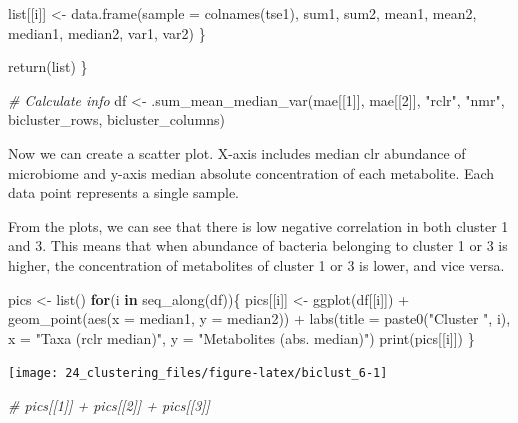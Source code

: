\documentclass[
]{book}
\newenvironment{Shaded}{\begin{snugshade}}{\end{snugshade}}
\newcommand{\AttributeTok}[1]{\textcolor[rgb]{0.77,0.63,0.00}{#1}}
\newcommand{\CommentTok}[1]{\textcolor[rgb]{0.56,0.35,0.01}{\textit{#1}}}
\newcommand{\ControlFlowTok}[1]{\textcolor[rgb]{0.13,0.29,0.53}{\textbf{#1}}}
\newcommand{\DecValTok}[1]{\textcolor[rgb]{0.00,0.00,0.81}{#1}}
\newcommand{\FunctionTok}[1]{\textcolor[rgb]{0.00,0.00,0.00}{#1}}
\newcommand{\NormalTok}[1]{#1}
\newcommand{\OtherTok}[1]{\textcolor[rgb]{0.56,0.35,0.01}{#1}}
\newcommand{\SpecialCharTok}[1]{\textcolor[rgb]{0.00,0.00,0.00}{#1}}
\newcommand{\StringTok}[1]{\textcolor[rgb]{0.31,0.60,0.02}{#1}}
\begin{document}
\begin{Shaded}
\begin{Highlighting}[]
\NormalTok{    list[[i]] }\OtherTok{\textless{}{-}} \FunctionTok{data.frame}\NormalTok{(}\AttributeTok{sample =} \FunctionTok{colnames}\NormalTok{(tse1), sum1, sum2, mean1, mean2, }
\NormalTok{                     median1, median2, var1, var2)}
\NormalTok{  \}}

  \FunctionTok{return}\NormalTok{(list)}
\NormalTok{\}}

\CommentTok{\# Calculate info}
\NormalTok{df }\OtherTok{\textless{}{-}} \FunctionTok{.sum\_mean\_median\_var}\NormalTok{(mae[[}\DecValTok{1}\NormalTok{]], mae[[}\DecValTok{2}\NormalTok{]], }\StringTok{"rclr"}\NormalTok{, }\StringTok{"nmr"}\NormalTok{, bicluster\_rows, bicluster\_columns)}
\end{Highlighting}
\end{Shaded}

Now we can create a scatter plot. X-axis includes median clr abundance
of microbiome and y-axis median absolute concentration of each
metabolite. Each data point represents a single sample.

From the plots, we can see that there is low negative correlation in
both cluster 1 and 3. This means that when abundance of bacteria
belonging to cluster 1 or 3 is higher, the concentration of
metabolites of cluster 1 or 3 is lower, and vice versa.

\begin{Shaded}
\begin{Highlighting}[]
\NormalTok{pics }\OtherTok{\textless{}{-}} \FunctionTok{list}\NormalTok{()}
\ControlFlowTok{for}\NormalTok{(i }\ControlFlowTok{in} \FunctionTok{seq\_along}\NormalTok{(df))\{}
\NormalTok{  pics[[i]] }\OtherTok{\textless{}{-}} \FunctionTok{ggplot}\NormalTok{(df[[i]])  }\SpecialCharTok{+}
      \FunctionTok{geom\_point}\NormalTok{(}\FunctionTok{aes}\NormalTok{(}\AttributeTok{x =}\NormalTok{ median1, }\AttributeTok{y =}\NormalTok{ median2)) }\SpecialCharTok{+} 
      \FunctionTok{labs}\NormalTok{(}\AttributeTok{title =} \FunctionTok{paste0}\NormalTok{(}\StringTok{"Cluster "}\NormalTok{, i),}
           \AttributeTok{x =} \StringTok{"Taxa (rclr median)"}\NormalTok{,}
           \AttributeTok{y =} \StringTok{"Metabolites (abs. median)"}\NormalTok{)}
  \FunctionTok{print}\NormalTok{(pics[[i]])}
\NormalTok{\}}
\end{Highlighting}
\end{Shaded}

\texttt{[image: 24\_clustering\_files/figure-latex/biclust\_6-1]}

\begin{Shaded}
\begin{Highlighting}[]
\CommentTok{\# pics[[1]] + pics[[2]] + pics[[3]]}
\end{Highlighting}
\end{Shaded}
\end{document}
